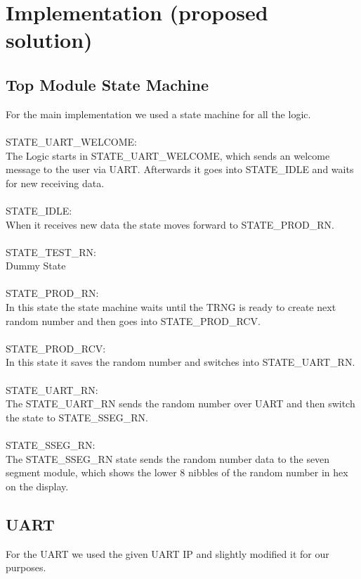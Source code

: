 \documentclass[%
	a4paper,
]
{article}
\begin{document}


%
%
\section{Implementation (proposed solution)}
\label{sec:solution}




\subsection{Top Module State Machine}
For the main implementation we used a state machine for all the logic. \\\\
STATE_UART_WELCOME:\\
The Logic starts in STATE_UART_WELCOME, which sends an welcome message to the user via UART. Afterwards it goes
into STATE_IDLE and waits for new receiving data. \\\\
STATE_IDLE:\\
When it receives new data the state moves forward to STATE_PROD_RN. \\\\
STATE_TEST_RN:\\
Dummy State\\\\
STATE_PROD_RN:\\
In this state the state machine waits until the TRNG is ready to create next random number and then goes into STATE_PROD_RCV.\\\\
STATE_PROD_RCV:\\
In this state it saves the random number and switches into STATE_UART_RN. \\\\
STATE_UART_RN:\\
The STATE_UART_RN sends the random number over UART and then switch the state to STATE_SSEG_RN. \\\\
STATE_SSEG_RN:\\
The STATE_SSEG_RN state sends the random number data to the seven segment module, which shows the lower 8 nibbles of the random number in hex on the display.\\

\subsection{UART}
For the UART we used the given UART IP and slightly modified it for our purposes.
\end{document}
